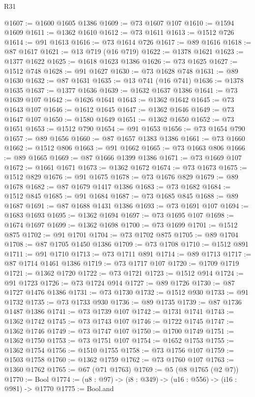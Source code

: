 \begin{lexlean}{R31}
\begin{coremodule}
@1607 := @1600 @1605 @1386
@1609 := @73 @1607 @107
@1610 := @1594 @1609
@1611 := @1362 @1610
@1612 := @73 @1611
@1613 := @1512 @726
@1614 := @91 @1613
@1616 := @73 @1614 @726
@1617 := @89 @1616
@1618 := @87 @1617
@1621 := @13 @719 (@16 @719)
@1622 := @1378 @1621
@1623 := @1377 @1622
@1625 := @1618 @1623 @1386
@1626 := @73 @1625
@1627 := @1512 @748
@1628 := @91 @1627
@1630 := @73 @1628 @748
@1631 := @89 @1630
@1632 := @87 @1631
@1635 := @13 @741 (@16 @741)
@1636 := @1378 @1635
@1637 := @1377 @1636
@1639 := @1632 @1637 @1386
@1641 := @73 @1639 @107
@1642 := @1626 @1641
@1643 := @1362 @1642
@1645 := @73 @1643 @107
@1646 := @1612 @1645
@1647 := @1362 @1646
@1649 := @73 @1647 @107
@1650 := @1580 @1649
@1651 := @1362 @1650
@1652 := @73 @1651
@1653 := @1512 @790
@1654 := @91 @1653
@1656 := @73 @1654 @790
@1657 := @89 @1656
@1660 := @87 @1657 @1383 @1386
@1661 := @73 @1660
@1662 := @1512 @806
@1663 := @91 @1662
@1665 := @73 @1663 @806
@1666 := @89 @1665
@1669 := @87 @1666 @1399 @1386
@1671 := @73 @1669 @107
@1672 := @1661 @1671
@1673 := @1362 @1672
@1674 := @73 @1673
@1675 := @1512 @829
@1676 := @91 @1675
@1678 := @73 @1676 @829
@1679 := @89 @1678
@1682 := @87 @1679 @1417 @1386
@1683 := @73 @1682
@1684 := @1512 @845
@1685 := @91 @1684
@1687 := @73 @1685 @845
@1688 := @89 @1687
@1691 := @87 @1688 @1431 @1386
@1693 := @73 @1691 @107
@1694 := @1683 @1693
@1695 := @1362 @1694
@1697 := @73 @1695 @107
@1698 := @1674 @1697
@1699 := @1362 @1698
@1700 := @73 @1699
@1701 := @1512 @875
@1702 := @91 @1701
@1704 := @73 @1702 @875
@1705 := @89 @1704
@1708 := @87 @1705 @1450 @1386
@1709 := @73 @1708
@1710 := @1512 @891
@1711 := @91 @1710
@1713 := @73 @1711 @891
@1714 := @89 @1713
@1717 := @87 @1714 @1461 @1386
@1719 := @73 @1717 @107
@1720 := @1709 @1719
@1721 := @1362 @1720
@1722 := @73 @1721
@1723 := @1512 @914
@1724 := @91 @1723
@1726 := @73 @1724 @914
@1727 := @89 @1726
@1730 := @87 @1727 @1476 @1386
@1731 := @73 @1730
@1732 := @1512 @930
@1733 := @91 @1732
@1735 := @73 @1733 @930
@1736 := @89 @1735
@1739 := @87 @1736 @1487 @1386
@1741 := @73 @1739 @107
@1742 := @1731 @1741
@1743 := @1362 @1742
@1745 := @73 @1743 @107
@1746 := @1722 @1745
@1747 := @1362 @1746
@1749 := @73 @1747 @107
@1750 := @1700 @1749
@1751 := @1362 @1750
@1753 := @73 @1751 @107
@1754 := @1652 @1753
@1755 := @1362 @1754
@1756 := @1510 @1755
@1758 := @73 @1756 @107
@1759 := @1503 @1758
@1760 := @1362 @1759
@1762 := @73 @1760 @107
@1763 := @1360 @1762
@1765 := @67 (@71 @1763)
@1769 := @5 (@8 @1765 (@2 @7))
@1770 := Bool
@1774 := (u8 : @97) -> (i8 : @349) -> (u16 : @556) -> (i16 : @981) -> @1770
@1775 := Bool.and

\end{coremodule}
\end{lexlean}
